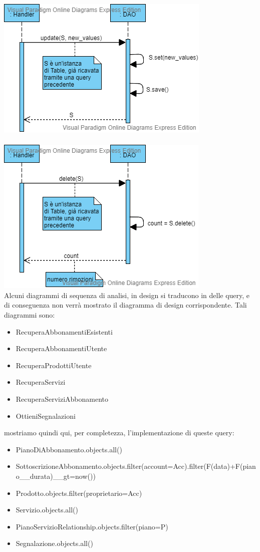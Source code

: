 \includegraphics[scale=0.7]{../Contents/Diagrams/Design/sequence/DAO/update.png}\\ \\
\includegraphics[scale=0.7]{../Contents/Diagrams/Design/sequence/DAO/delete.png}\\
Alcuni diagrammi di sequenza di analisi, in design si traducono in delle query, e di conseguenza non verrà mostrato il diagramma di design corrispondente. Tali diagrammi sono:
\begin{itemize}
\item RecuperaAbbonamentiEsistenti
\item RecuperaAbbonamentiUtente
\item RecuperaProdottiUtente
\item RecuperaServizi
\item RecuperaServiziAbbonamento
\item OttieniSegnalazioni
\end{itemize}
mostriamo quindi qui, per completezza, l'implementazione di queste query:
\begin{itemize}
\item PianoDiAbbonamento.objects.all()
\item SottoscrizioneAbbonamento.objects.filter(account=Acc).filter(F(data)+F(piano\_\_durata)\_\_gt=now())
\item Prodotto.objects.filter(proprietario=Acc)
\item Servizio.objects.all()
\item PianoServizioRelationship.objects.filter(piano=P)
\item Segnalazione.objects.all()
\end{itemize}
